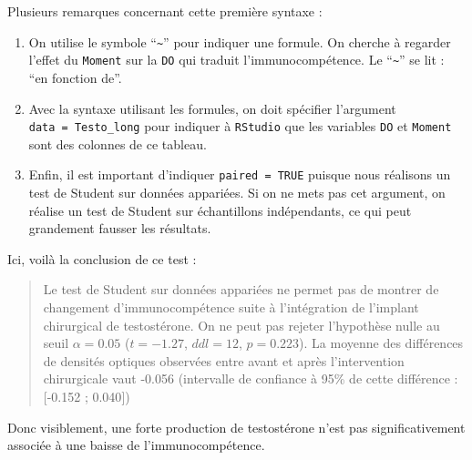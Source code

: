 \documentclass[
  a4paper,
  DIV=11,
  numbers=noendperiod,
  oneside]{scrreprt}
\providecommand{\tightlist}{%
  \setlength{\itemsep}{0pt}\setlength{\parskip}{0pt}}\usepackage{longtable,booktabs,array}
\begin{document}
Plusieurs remarques concernant cette première syntaxe :

\begin{enumerate}
\def\labelenumi{\arabic{enumi}.}
\tightlist
\item
  On utilise le symbole ``\texttt{\textasciitilde{}}'' pour indiquer une
  formule. On cherche à regarder l'effet du \texttt{Moment} sur la
  \texttt{DO} qui traduit l'immunocompétence. Le
  ``\texttt{\textasciitilde{}}'' se lit : ``en fonction de''.
\item
  Avec la syntaxe utilisant les formules, on doit spécifier l'argument
  \texttt{data\ =\ Testo\_long} pour indiquer à \texttt{RStudio} que les
  variables \texttt{DO} et \texttt{Moment} sont des colonnes de ce
  tableau.
\item
  Enfin, il est important d'indiquer \texttt{paired\ =\ TRUE} puisque
  nous réalisons un test de Student sur données appariées. Si on ne mets
  pas cet argument, on réalise un test de Student sur échantillons
  indépendants, ce qui peut grandement fausser les résultats.
\end{enumerate}

Ici, voilà la conclusion de ce test :

\begin{quote}
Le test de Student sur données appariées ne permet pas de montrer de
changement d'immunocompétence suite à l'intégration de l'implant
chirurgical de testostérone. On ne peut pas rejeter l'hypothèse nulle au
seuil \(\alpha = 0.05\) (\(t = -1.27\), \(ddl = 12\), \(p = 0.223\)). La
moyenne des différences de densités optiques observées entre avant et
après l'intervention chirurgicale vaut -0.056 (intervalle de confiance à
95\% de cette différence : {[}-0.152 ; 0.040{]})
\end{quote}

Donc visiblement, une forte production de testostérone n'est pas
significativement associée à une baisse de l'immunocompétence.
\end{document}

